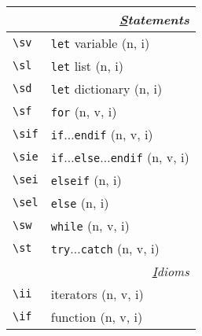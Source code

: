 \documentclass[oneside,10pt,landscape,DIV16]{scrartcl}
\begin{document}
\begin{multicols}{3}
\begin{center}
\begin{tabular}[]{|p{18mm}|p{56mm}|}
\hline
\end{tabular}\\
%
%
\begin{tabular}[]{|p{11mm}|p{56mm}|}
\hline
\multicolumn{2}{|r|}{\textsl{\underline{S}tatements}}\\[1.0ex]
\hline \verb'\sv'     & \verb'let' variable                              \hfill (n, i)\\
\hline \verb'\sl'     & \verb'let' list                                  \hfill (n, i)\\
\hline \verb'\sd'     & \verb'let' dictionary                            \hfill (n, i)\\
\hline \verb'\sf'     & \verb'for'                                       \hfill (n, v, i)\\
\hline \verb'\sif'    & \verb'if'$\ldots$\verb'endif'                    \hfill (n, v, i)\\
\hline \verb'\sie'    & \verb'if'$\ldots$\verb'else'$\ldots$\verb'endif' \hfill (n, v, i)\\
\hline \verb'\sei'    & \verb'elseif'                                    \hfill (n, i)\\
\hline \verb'\sel'    & \verb'else'                                      \hfill (n, i)\\
\hline \verb'\sw'     & \verb'while'                                     \hfill (n, v, i)\\
\hline \verb'\st'     & \verb'try'$\ldots$\verb'catch'                   \hfill (n, v, i)\\
\hline
\hline
\multicolumn{2}{|r|}{\textsl{\underline{I}dioms}}                 \\[1.0ex]
\hline \verb'\ii'  & iterators      \hfill (n, v, i)   \\
%
\hline \verb'\if' & function                  \hfill (n, v, i)\\
\hline

\end{tabular}
\end{center}
\end{multicols}
\end{document}
